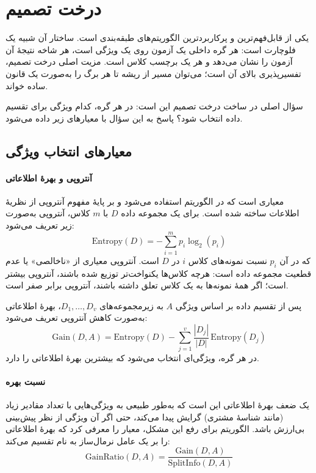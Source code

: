 \section{درخت تصمیم}
\label{sec:decision-tree}

 یکی از قابل‌فهم‌ترین و
پرکاربردترین الگوریتم‌های طبقه‌بندی است. ساختار آن شبیه یک فلوچارت است:
هر گره داخلی یک آزمون روی یک ویژگی است، هر شاخه نتیجهٔ آن آزمون را نشان
می‌دهد و هر  یک برچسب کلاس است. مزیت اصلی درخت تصمیم،
تفسیرپذیری بالای آن است؛ می‌توان مسیر از ریشه تا هر برگ را به‌صورت یک
قانون  ساده خواند.

سؤال اصلی در ساخت درخت تصمیم این است: در هر گره، کدام ویژگی برای تقسیم
داده انتخاب شود؟ پاسخ به این سؤال با معیارهای زیر داده می‌شود.

\subsection{معیارهای انتخاب ویژگی}
\label{subsec:split-criteria}

\paragraph{آنتروپی و بهرهٔ اطلاعاتی}
 معیاری است که در
الگوریتم  استفاده می‌شود و بر پایهٔ مفهوم آنتروپی از نظریهٔ
اطلاعات ساخته شده است. برای یک مجموعه داده $D$ با $m$ کلاس، آنتروپی
به‌صورت زیر تعریف می‌شود:
\[
\text{Entropy}(D) = -\sum_{i=1}^{m} p_i \log_2(p_i)
\]
که در آن $p_i$ نسبت نمونه‌های کلاس $i$ در $D$ است. آنتروپی معیاری از
«ناخالصی» یا عدم قطعیت مجموعه داده است: هرچه کلاس‌ها یکنواخت‌تر توزیع
شده باشند، آنتروپی بیشتر است؛ اگر همهٔ نمونه‌ها به یک کلاس تعلق داشته
باشند، آنتروپی برابر صفر است.

پس از تقسیم داده بر اساس ویژگی $A$ به زیرمجموعه‌های $D_1, \ldots, D_v$،
بهرهٔ اطلاعاتی به‌صورت کاهش آنتروپی تعریف می‌شود:
\[
\text{Gain}(D, A) = \text{Entropy}(D) - \sum_{j=1}^{v} \frac{|D_j|}{|D|} \, \text{Entropy}(D_j)
\]
در هر گره، ویژگی‌ای انتخاب می‌شود که بیشترین بهرهٔ اطلاعاتی را دارد.

\paragraph{نسبت بهره}
یک ضعف بهرهٔ اطلاعاتی این است که به‌طور طبیعی به ویژگی‌هایی با تعداد
مقادیر زیاد (مانند شناسهٔ مشتری) گرایش پیدا می‌کند، حتی اگر آن ویژگی از
نظر پیش‌بینی بی‌ارزش باشد. الگوریتم  برای رفع این مشکل، معیار
 را معرفی کرد که بهرهٔ اطلاعاتی را
بر یک عامل نرمال‌ساز به نام
 تقسیم می‌کند:
\[
\text{GainRatio}(D, A) = \frac{\text{Gain}(D, A)}{\text{SplitInfo}(D, A)}
\]

